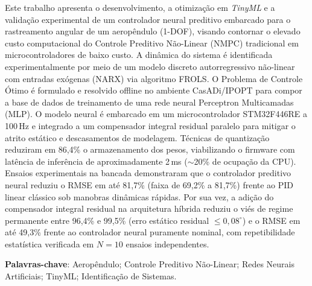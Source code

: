 \begin{resumo}
\SingleSpacing

    \noindent Este trabalho apresenta o desenvolvimento, a otimização em \textit{TinyML} e a validação experimental de um controlador neural preditivo embarcado para o rastreamento angular de um aeropêndulo (1-DOF), visando contornar o elevado custo computacional do Controle Preditivo Não-Linear (NMPC) tradicional em microcontroladores de baixo custo. A dinâmica do sistema é identificada experimentalmente por meio de um modelo discreto autorregressivo não-linear com entradas exógenas (NARX) via algoritmo FROLS. O Problema de Controle Ótimo é formulado e resolvido offline no ambiente CasADi/IPOPT para compor a base de dados de treinamento de uma rede neural Perceptron Multicamadas (MLP). O modelo neural é embarcado em um microcontrolador STM32F446RE a 100\,Hz e integrado a um compensador integral residual paralelo para mitigar o atrito estático e descasamentos de modelagem. Técnicas de quantização reduziram em 86,4\% o armazenamento dos pesos, viabilizando o firmware com latência de inferência de aproximadamente 2\,ms ($\sim$20\% de ocupação da CPU). Ensaios experimentais na bancada demonstraram que o controlador preditivo neural reduziu o RMSE em até 81,7\% (faixa de 69,2\% a 81,7\%) frente ao PID linear clássico sob manobras dinâmicas rápidas. Por sua vez, a adição do compensador integral residual na arquitetura híbrida reduziu o viés de regime permanente entre 96,4\% e 99,5\% (erro estático residual $\le 0{,}08^\circ$) e o RMSE em até 49,3\% frente ao controlador neural puramente nominal, com repetibilidade estatística verificada em $N = 10$ ensaios independentes.

    \vspace{\onelineskip}

    \noindent
    \textbf{Palavras-chave}: Aeropêndulo; Controle Preditivo Não-Linear; Redes Neurais Artificiais; TinyML; Identificação de Sistemas.

\end{resumo}

